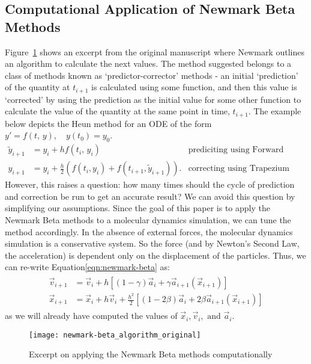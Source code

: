\documentclass[../Main.tex]{subfiles}
\begin{document}
\subsection{Computational Application of Newmark Beta Methods} \label{subsection:numerical_newmark-beta}
Figure~\ref{fig:newmark-beta_algorithm_original} shows an excerpt from the original manuscript \cite{Newmark1959} where Newmark outlines an algorithm to calculate the next values. The method suggested belongs to a class of methods known as `predictor-corrector' methods - an initial `prediction' of the quantity at $t_{i+1}$ is calculated using some function, and then this value is `corrected' by using the prediction as the initial value for some other function to calculate the value of the quantity at the same point in time, $t_{i+1}$. The example below depicts the Heun method for an ODE of the form $y' = f\left(t\mbox{, }y\right), \quad y\left(t_{0}\right) = y_{0}$.
\begin{align*}
	\tilde{y}_{i+1} & = y_{i} + hf\left(t_{i}\mbox{, }y_{i}\right) & \mbox{prediciting using Forward Euler Method} \\
	y_{i+1} & = y_{i} + \frac{h}{2}\left(f\left(t_{i}, y_{i}\right) + f\left(t_{i+1}, \tilde{y}_{i+1}\right)\right). & \mbox{correcting using Trapezium Rule}
\end{align*}
However, this raises a question: how many times should the cycle of prediction and correction be run to get an accurate result? We can avoid this question by simplifying our assumptions. Since the goal of this paper is to apply the Newmark Beta methods to a molecular dynamics simulation, we can tune the method accordingly. In the absence of external forces, the molecular dynamics simulation is a conservative system. So the force (and by Newton's Second Law, the acceleration) is dependent only on the displacement of the particles. Thus, we can re-write Equation\ref{eqn:newmark-beta} as:
\begin{align*}
	\begin{split}
		\vec{v}_{i+1} & = \vec{v}_{i} + h\left[\left(1-\gamma\right)\vec{a}_{i} + \gamma\vec{a}_{i+1}\left(\vec{x}_{i+1}\right)\right] \\
		\vec{x}_{i+1} & = \vec{x}_{i} + h\vec{v}_{i} + \frac{h^2}{2}\left[\left(1-2\beta \right)\vec{a}_{i} + 2\beta\vec{a}_{i+1}\left(\vec{x}_{i+1}\right)\right] 
	\end{split}
\end{align*}
as we will already have computed the values of $\vec{x}_{i}, \vec{v}_{i},\mbox{ and }\vec{a}_{i}$.
\begin{figure}[h]
\texttt{[image: newmark-beta\_algorithm\_original]}
\centering
\caption{Excerpt on applying the Newmark Beta methods computationally}
\label{fig:newmark-beta_algorithm_original}
\end{figure}
\end{document}
